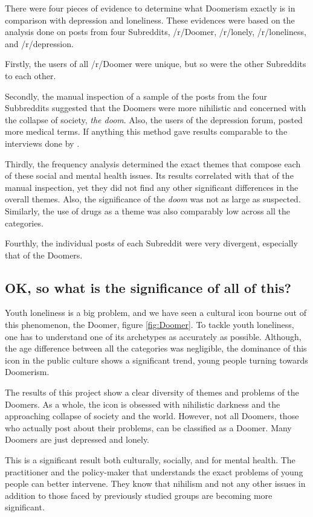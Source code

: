 \documentclass[../report.tex]{subfiles}
\begin{document}
There were four pieces of evidence to determine what Doomerism exactly is in comparison with depression and loneliness. 
These evidences were based on the analysis done on posts from four Subreddits, /r/Doomer, /r/lonely, /r/loneliness, and /r/depression.

Firstly, the users of all /r/Doomer were unique, but so were the other Subreddits to each other. 

Secondly, the manual inspection of a sample of the posts from the four Subbreddits suggested that the Doomers were more nihilistic and concerned with the collapse of society, \textit{the doom}. Also, the users of the depression forum, posted more medical terms.
If anything this method gave results comparable to the interviews done by \cite{fardghassemi_interviews}.

Thirdly, the frequency analysis determined the exact themes that compose each of these social and mental health issues.
Its results correlated with that of the manual inspection, yet they did not find any other significant differences in the overall themes. 
Also, the significance of the \textit{doom} was not as large as suspected.
Similarly, the use of drugs as a theme was also comparably low across all the categories. 

Fourthly, the individual posts of each Subreddit were very divergent, especially that of the Doomers.

\subsection{OK, so what is the significance of all of this?}
Youth loneliness is a big problem, and we have seen a cultural icon bourne out of this phenomenon, the Doomer, figure \ref{fig:Doomer}. 
To tackle youth loneliness, one has to understand one of its archetypes as accurately as possible. 
Although, the age difference between all  the categories was negligible, the dominance of this icon in the public culture shows a significant trend, young people turning towards Doomerism.

The results of this project show a clear diversity of themes and problems of the Doomers.
As a whole, the icon is obsessed with nihilistic darkness and the approaching collapse of society and the world. 
However, not all Doomers, those who actually post about their problems, can be classified as a Doomer.
Many Doomers are just depressed and lonely.

This is a significant result both culturally, socially, and for mental health. 
The practitioner and the policy-maker that understands the exact problems of young people can better intervene.
They know that nihilism and not any other issues in addition to those faced by previously studied groups are becoming more significant.
\end{document}
